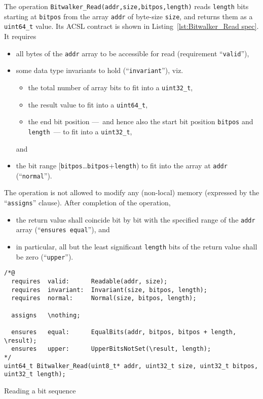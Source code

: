 The operation \lstinline{Bitwalker_Read(addr,size,bitpos,length)} reads
\lstinline{length} bits starting at \lstinline{bitpos} from the array
\lstinline{addr} of byte-size \lstinline{size}, and returns them as a
\lstinline{uint64_t} value.
%
Its ACSL contract is shown in Listing~\ref{lst:Bitwalker_Read spec}.
%
It requires
%
\begin{itemize}
\item all bytes of the \lstinline{addr} array to be accessible for read
	(requirement ``\lstinline{valid}''),
\item some data type invariants to hold
	(``\lstinline{invariant}''), viz.\
	\begin{itemize}
	\item the total number of array bits to fit into a
		\lstinline{uint32_t},
	\item the result value to fit into a \lstinline{uint64_t},
	\item the end bit position ---~and hence also the start bit position
		\lstinline{bitpos} and \lstinline{length}~---
		to fit into a \lstinline{uint32_t}, 
	\end{itemize}
	and
\item the bit range
	[\lstinline{bitpos}\ldots\lstinline{bitpos}+\lstinline{length})
	to fit into the array at \lstinline{addr}
	(``\lstinline{normal}'').
\end{itemize}
%
The operation is not allowed to modify any (non-local) memory
(expressed by the ``\lstinline{assigns}'' clause).
%
After completion of the operation,
%
\begin{itemize}
\item the return value shall coincide bit by bit with the specified
	range of the
	\lstinline{addr} array (``\lstinline{ensures equal}''), and
\item in particular, all but the least significant \lstinline{length}
	bits of the return value shall be zero (``\lstinline{upper}'').
\end{itemize}







\begin{listing}[hbt]
\begin{minipage}{0.99\textwidth}
\begin{lstlisting}[style=acsl-block]
/*@
  requires  valid:      Readable(addr, size);
  requires  invariant:  Invariant(size, bitpos, length);
  requires  normal:     Normal(size, bitpos, length);

  assigns   \nothing;

  ensures   equal:      EqualBits(addr, bitpos, bitpos + length, \result);
  ensures   upper:      UpperBitsNotSet(\result, length);
*/
uint64_t Bitwalker_Read(uint8_t* addr, uint32_t size, uint32_t bitpos, uint32_t length);
\end{lstlisting}
\end{minipage}
\caption{\label{lst:Bitwalker_Read spec}Reading a bit sequence}
\end{listing}





